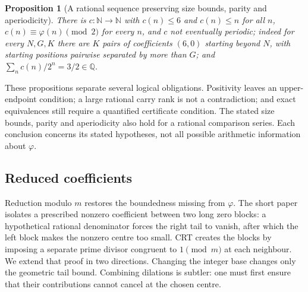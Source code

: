 \documentclass[11pt]{article}
\theoremstyle{plain}
\newtheorem{prop}[thm]{Proposition}
\theoremstyle{definition}
\theoremstyle{remark}
\newcommand{\N}{\mathbb{N}}
\newcommand{\Q}{\mathbb{Q}}
\begin{document}
\begin{prop}[A rational sequence preserving size bounds, parity and aperiodicity]
\label{prop:parity}
There is $c : \N \to \N$ with $c(n) \le 6$ and $c(n) \le n$ for all $n$,
$c(n) \equiv \varphi(n) \pmod 2$ for \emph{every} $n$, and $c$ not eventually
periodic; indeed for every $N, G, K$ there are $K$ pairs of coefficients
$(6,0)$ starting beyond $N$, with starting positions pairwise separated
by more than $G$; and
$\sum_n c(n)/2^{n} = 3/2 \in \Q$.
\end{prop}

These propositions separate several logical obligations. Positivity leaves
an upper-endpoint condition; a large rational carry rank is not a contradiction;
and exact equivalences still require a quantified certificate condition. The stated size
bounds, parity and aperiodicity also hold for a rational comparison series. Each
conclusion concerns its stated hypotheses, not all possible arithmetic
information about $\varphi$.

\subsection{Reduced coefficients}\label{sub:reduced-coefficients}

Reduction modulo $m$ restores the boundedness missing from $\varphi$.
The short paper isolates a prescribed nonzero coefficient between two
long zero blocks: a hypothetical rational denominator forces the
right tail to vanish, after which the left block makes the nonzero
centre too small. CRT creates the blocks by imposing a separate
prime divisor congruent to $1\pmod m$ at each neighbour.
We extend that proof in two directions. Changing the integer base
changes only the geometric tail bound. Combining dilations is subtler:
one must first ensure that their contributions cannot cancel at the
chosen centre.
\end{document}
